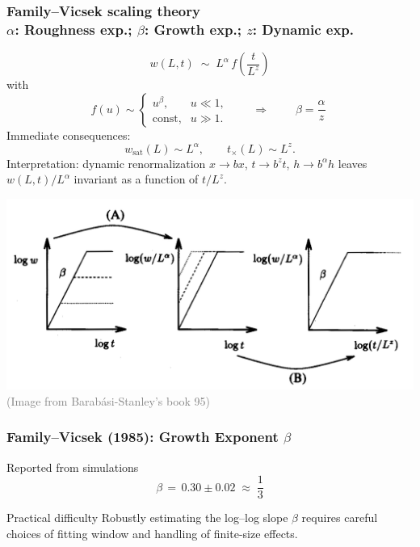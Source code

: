 \documentclass[9pt,table,xcolor=dvipsnames]{beamer}
\begin{document}
\begin{frame}[t]
   \frametitle{Family--Vicsek scaling theory \\
   \small $\alpha$: Roughness exp.; $\beta$: Growth exp.; $z$: Dynamic exp.}
   \small
  \[
    \boxed{\;w(L,t)\;\sim\; L^{\alpha}\, f\!\left(\dfrac{t}{L^{z}}\right)\;}
  \]
  with
  \[
    f(u)\sim
    \begin{cases}
      u^{\beta},    & u\ll1, \\
      \text{const}, & u\gg1.
    \end{cases}
    \qquad\Rightarrow\qquad
    \boxed{\;\beta=\dfrac{\alpha}{z}\;}
  \]
  Immediate consequences:
  \[
    w_{\mathrm{sat}}(L) \sim L^{\alpha},\qquad
    t_\times(L)\sim L^{z}.
  \]
  Interpretation: dynamic renormalization $x\!\to\! b x$, $t\!\to\! b^{z}t$,
  $h\!\to\! b^{\alpha}h$ leaves $w(L,t)/L^{\alpha}$ invariant as a function of
  $t/L^{z}$.

  \vfill
  \begin{center}
    \includegraphics[width=0.6\linewidth]{./figs/FV.png} \\

    {\footnotesize \textcolor{gray}{(Image from Barab\'asi-Stanley's book 95)}}
  \end{center}

\end{frame}
\begin{frame} %
  \frametitle{Family--Vicsek (1985): Growth Exponent $\beta$}

  \begin{assblock}{Reported from simulations}
    \[
      \boxed{\;\beta \,=\, 0.30 \pm 0.02 \;\approx\; \frac{1}{3}\;}
    \]
  \end{assblock}
  \vfill

  \begin{problock}{Practical difficulty}
    Robustly estimating the log--log slope $\beta$ requires careful choices of
    fitting window and handling of finite-size effects.
  \end{problock}

  \vspace{0.2em}
\end{frame}
\end{document}
